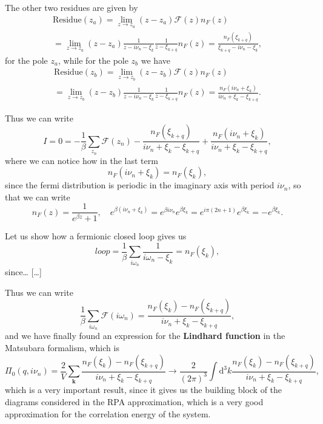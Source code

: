 The other two residues are given by
\[
    \begin{aligned}
        \text{Residue}(z_a) = \lim_{z \to z_a} (z - z_a) \mathcal{F}(z) n_F(z) \\
        = \lim_{z \to z_a} (z-z_a) \frac{1}{z - i \nu_n - \xi_k} \frac{1}{z - \xi_{k+q}} n_F(z) = \frac{n_F(\xi_{k+q})}{\xi_{k+q} - i \nu_n - \xi_k},
    \end{aligned}
\]
for the pole \(z_a\), while for the pole \(z_b\) we have
\[
    \begin{aligned}
        \text{Residue}(z_b) = \lim_{z \to z_b} (z - z_b) \mathcal{F}(z) n_F(z) \\
        = \lim_{z \to z_b} (z-z_b) \frac{1}{z - i \nu_n - \xi_k} \frac{1}{z - \xi_{k+q}} n_F(z) = \frac{n_F(i \nu_n + \xi_k)}{i \nu_n + \xi_k - \xi_{k+q}}.
    \end{aligned}
\]

Thus we can write
\[
    I = 0 = - \frac{1}{\beta} \sum_{z_n} \mathcal{F}(z_n) - \frac{n_F(\xi_{k+q})}{ i \nu_n + \xi_k -\xi_{k+q}} + \frac{n_F(i \nu_n + \xi_k)}{i \nu_n + \xi_k - \xi_{k+q}},
\]
where we can notice how in the last term
\[
    n_F(i \nu_n + \xi_k) = n_F(\xi_k),
\]
since the fermi distribution is periodic in the imaginary axis with period \(i \nu_n\), so that we can write
\[
    n_F(z) = \frac{1}{e^{\beta z} + 1}, \quad e^{\beta (i \nu_n + \xi_k)} = e^{\beta i \nu_n} e^{\beta \xi_k} = e^{i \pi (2n + 1)} e^{\beta \xi_k} = - e^{\beta \xi_k}.
\]

\begin{example}
    Let us show how a fermionic closed loop gives us
    \[
        loop = \frac{1}{\beta} \sum_{i \omega_n} \frac{1}{i \omega_n - \xi_k} = n_F(\xi_k),
    \]
    since\dots
    [\dots]
\end{example}

Thus we can write
\[
    \frac{1}{\beta} \sum_{i \omega_n} \mathcal{F}(i \omega_n) = \frac{n_F(\xi_{k}) - n_F(\xi_{k+q})}{i \nu_n + \xi_k - \xi_{k+q}},
\]
and we have finally found an expression for the \textbf{Lindhard function} in the Matsubara formalism, which is
\[
    \Pi_0(q, i \nu_n) = \frac{2}{V} \sum_{\mathbf{k}} \frac{n_F(\xi_{k}) - n_F(\xi_{k+q})}{i \nu_n + \xi_k - \xi_{k+q}} \to \frac{2}{(2\pi)^3} \int \mathrm{d}^3 k \frac{n_F(\xi_{k}) - n_F(\xi_{k+q})}{i \nu_n + \xi_k - \xi_{k+q}},
\]
which is a very important result, since it gives us the building block of the diagrams considered in the RPA approximation, which is a very good approximation for the correlation energy of the system.

